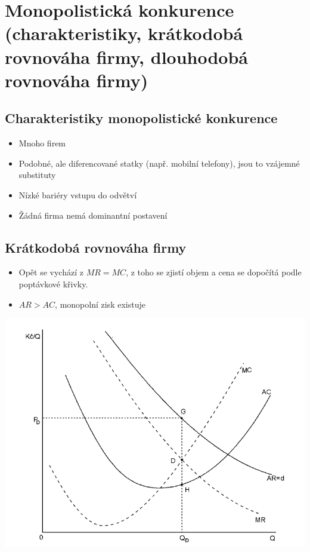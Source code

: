 \clearpage
\section{Monopolistická konkurence (charakteristiky, krátkodobá rovnováha firmy,
dlouhodobá rovnováha firmy)}

\subsection{Charakteristiky monopolistické konkurence}
\begin{itemize}
    \item Mnoho firem
    \item Podobné, ale diferencované statky (např. mobilní telefony), jsou to vzájemné substituty
    \item Nízké bariéry vstupu do odvětví
    \item Žádná firma nemá dominantní postavení
\end{itemize}

\subsection{Krátkodobá rovnováha firmy}
\begin{itemize}
    \item Opět se vychází z $MR=MC$, z toho se zjistí objem a cena se dopočítá podle poptávkové křivky.
    \item $AR>AC$, monopolní zisk existuje
\end{itemize}
\includegraphics[width=16cm]{images/15_kratkodobe.png}

